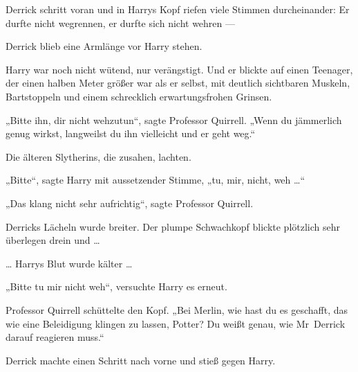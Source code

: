 Derrick schritt voran und in Harrys Kopf riefen viele Stimmen durcheinander: Er durfte nicht wegrennen, er durfte sich nicht wehren —

Derrick blieb eine Armlänge vor Harry stehen.

Harry war noch nicht wütend, nur verängstigt. Und er blickte auf einen Teenager, der einen halben Meter größer war als er selbst, mit deutlich sichtbaren Muskeln, Bartstoppeln und einem schrecklich erwartungsfrohen Grinsen.

„Bitte ihn, dir nicht wehzutun“, sagte Professor Quirrell.
„Wenn du jämmerlich genug wirkst, langweilst du ihn vielleicht und er geht weg.“

Die älteren Slytherins, die zusahen, lachten.

„Bitte“, sagte Harry mit aussetzender Stimme, „tu, mir, nicht, weh …“

„Das klang nicht sehr aufrichtig“, sagte Professor Quirrell.

Derricks Lächeln wurde breiter. Der plumpe Schwachkopf blickte plötzlich sehr überlegen drein und …

… Harrys Blut wurde kälter …

„Bitte tu mir nicht weh“, versuchte Harry es erneut.

Professor Quirrell schüttelte den Kopf.
„Bei Merlin, wie hast du es geschafft, das wie eine Beleidigung klingen zu lassen, Potter? Du weißt genau, wie Mr~Derrick darauf reagieren muss.“

Derrick machte einen Schritt nach vorne und stieß gegen Harry.

